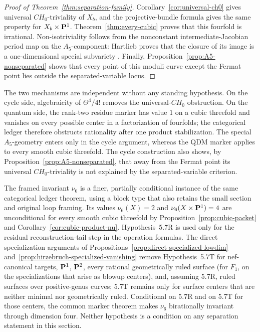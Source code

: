 \begin{proof}[Proof of Theorem~\ref{thm:separation-family}]
Corollary~\ref{cor:universal-ch0} gives universal \(CH_0\)-triviality of
\(X_b\), and the projective-bundle formula gives the same property for
\(X_b\times\mathbf P^1\).  Theorem~\ref{thm:every-cubic} proves that this
fourfold is irrational.  Non-isotriviality follows from the nonconstant
intermediate-Jacobian period map on the \(A_5\)-component: Hartlieb proves
that the closure of its image is a one-dimensional special subvariety
\cite[Proposition~5.7]{Hartlieb}.  Finally,
Proposition~\ref{prop:A5-nonseparated} shows that every point of this moduli
curve except the Fermat point lies outside the separated-variable locus.
%
%
%
\end{proof}

The two mechanisms are independent without any standing hypothesis.  On the
cycle side, algebraicity of \(\Theta^4/4!\) removes the
universal-\(CH_0\) obstruction.  On the quantum side, the rank-two residue
marker has value \(1\) on a cubic threefold and vanishes on every possible
center in a factorization of fourfolds; the categorical ledger therefore
obstructs rationality after one product stabilization.  The special
\(A_5\)-geometry enters only in the cycle argument, whereas the QDM marker
applies to every smooth cubic threefold.  The cycle construction also shows,
by Proposition~\ref{prop:A5-nonseparated}, that away from the Fermat point its
universal \(CH_0\)-triviality is not explained by the separated-variable
criterion.

The framed invariant \(\nu_6\) is a finer, partially conditional instance of
the same categorical ledger theorem, using a block type that also retains the
small section and original loop framing.  Its values \(\nu_6(X)=2\) and
\(\nu_6(X\times\mathbf P^1)=4\) are unconditional for every smooth cubic
threefold by Proposition~\ref{prop:cubic-packet} and
Corollary~\ref{cor:cubic-product-nu}.  Hypothesis~5.7R is used only for the
residual reconstruction-tail step in the operation formulas.  The direct
specialization arguments of Propositions~\ref{prop:direct-specialized-lowdim}
and~\ref{prop:hirzebruch-specialized-vanishing}
remove Hypothesis~5.7T for nef-canonical targets, \(\mathbf P^1\), \(\mathbf P^2\),
every rational geometrically ruled surface (for \(F_1\), on the
specializations that arise as blowup centers), and, assuming 5.7R, ruled
surfaces over positive-genus curves; 5.7T remains only for surface centers that
are neither minimal nor geometrically ruled.
Conditional on 5.7R and on 5.7T for those centers, the common marker theorem
makes \(\nu_6\) birationally invariant through dimension four.  Neither
hypothesis is a condition on any separation statement in this section.


